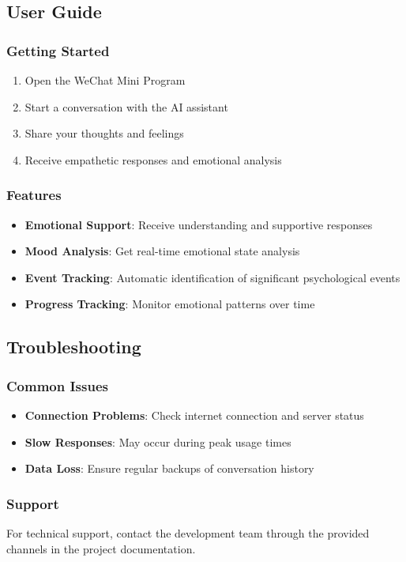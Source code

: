 \subsection{User Guide}

\subsubsection{Getting Started}

\begin{enumerate}
    \item Open the WeChat Mini Program
    \item Start a conversation with the AI assistant
    \item Share your thoughts and feelings
    \item Receive empathetic responses and emotional analysis
\end{enumerate}

\subsubsection{Features}

\begin{itemize}
    \item \textbf{Emotional Support}: Receive understanding and supportive responses
    \item \textbf{Mood Analysis}: Get real-time emotional state analysis
    \item \textbf{Event Tracking}: Automatic identification of significant psychological events
    \item \textbf{Progress Tracking}: Monitor emotional patterns over time
\end{itemize}

\subsection{Troubleshooting}

\subsubsection{Common Issues}

\begin{itemize}
    \item \textbf{Connection Problems}: Check internet connection and server status
    \item \textbf{Slow Responses}: May occur during peak usage times
    \item \textbf{Data Loss}: Ensure regular backups of conversation history
\end{itemize}

\subsubsection{Support}

For technical support, contact the development team through the provided channels in the project documentation. 